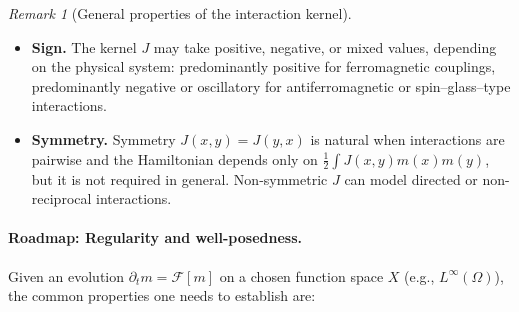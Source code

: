 \documentclass[11pt,a4paper]{article}
\theoremstyle{plain}
\theoremstyle{definition}
\theoremstyle{remark}
\newtheorem{remark}[theorem]{Remark}
\begin{document}
\begin{remark}[General properties of the interaction kernel]
	\begin{itemize}
		\item \textbf{Sign.}
		      The kernel $J$ may take positive, negative, or mixed values,
		      depending on the physical system:
		      predominantly positive for ferromagnetic couplings,
		      predominantly negative or oscillatory for antiferromagnetic or
		      spin–glass–type interactions.

		\item \textbf{Symmetry.}
		      Symmetry $J(x,y)=J(y,x)$ is natural when interactions are pairwise
		      and the Hamiltonian depends only on $\tfrac12\!\int\!J(x,y)m(x)m(y)$,
		      but it is not required in general.
		      Non-symmetric $J$ can model directed or non-reciprocal interactions.
	\end{itemize}
\end{remark}


\paragraph{Roadmap: Regularity and well-posedness.}
Given an evolution $\partial_t m = \mathcal{F}[m]$ on a chosen function space $X$ (e.g., $L^\infty(\Omega)$), the common properties one needs to establish are:
\end{document}
